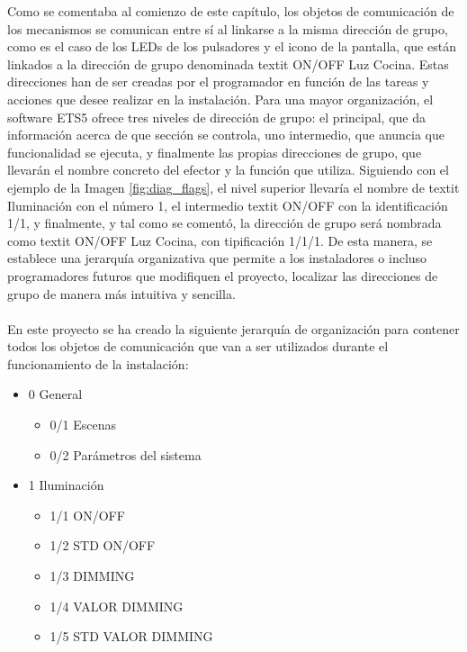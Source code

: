 Como se comentaba al comienzo de este capítulo, los objetos de comunicación de los mecanismos se comunican entre sí al linkarse a la misma dirección de grupo, como es el caso de los LEDs de los pulsadores y el icono de la pantalla, que están linkados a la dirección de grupo denominada textit {ON/OFF Luz Cocina}. Estas direcciones han de ser creadas por el programador en función de las tareas y acciones que desee realizar en la instalación. Para una mayor organización, el software ETS5 ofrece tres niveles de dirección de grupo: el principal, que da información acerca de que sección se controla, uno intermedio, que anuncia que funcionalidad se ejecuta, y finalmente las propias direcciones de grupo, que llevarán el nombre concreto del efector y la función que utiliza. Siguiendo con el ejemplo de la Imagen \ref{fig:diag_flags},  el nivel superior llevaría el nombre de textit {Iluminación} con el número 1, el intermedio textit {ON/OFF} con la identificación 1/1, y finalmente, y tal como se comentó, la dirección de grupo será nombrada como textit {ON/OFF Luz Cocina}, con tipificación 1/1/1. De esta manera, se establece una jerarquía organizativa que permite a los instaladores o incluso programadores futuros que modifiquen el proyecto, localizar las direcciones de grupo de manera más intuitiva y sencilla.\\\\
En este proyecto se ha creado la siguiente jerarquía de organización para contener todos los objetos de comunicación que van a ser utilizados durante el funcionamiento de la instalación:

\begin{multicols}{2} 
\begin{flushleft} 
\begin{itemize}
\item{0 General}
\begin{itemize}
\item{0/1 Escenas}
\item {0/2 Parámetros del sistema}
\end{itemize} 
\end{itemize} 
\vspace{1.5cm}
\end{flushleft} 

\begin{flushright}  
\begin{itemize}
\item{1 Iluminación}
\begin{itemize}
\item{1/1 ON/OFF}
\item{1/2 STD ON/OFF}
\item{1/3 DIMMING}
\item{1/4 VALOR DIMMING}
\item{1/5 STD VALOR DIMMING}
\end{itemize} 
\end{itemize} 
\end{flushright} 
\end{multicols} 

